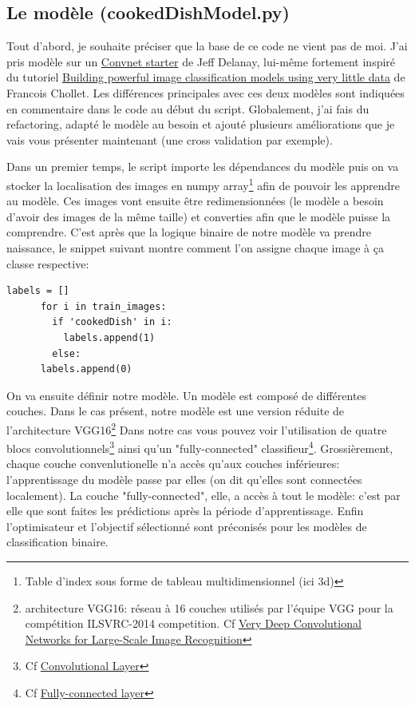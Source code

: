 \documentclass[a4paper,12pt]{report}
\begin{document}
      \subsection{Le modèle (cookedDishModel.py)}
      Tout d'abord, je souhaite préciser que la base de ce code ne vient pas de moi. J'ai pris modèle sur un \href{https://www.kaggle.com/vshevche/dogs-vs-cats-redux-kernels-edition/catdognet-keras-convnet-starter/run/790364}{Convnet starter} de Jeff Delanay, lui-même fortement inspiré du tutoriel \href{https://blog.keras.io/building-powerful-image-classification-models-using-very-little-data.html}{Building powerful image classification models using very little data} de Francois Chollet.
      \medbreak
      Les différences principales avec ces deux modèles sont indiquées en commentaire dans le code au début du script. Globalement, j'ai fais du refactoring, adapté le modèle au besoin et ajouté plusieurs améliorations que je vais vous présenter maintenant (une cross validation par exemple).
      \bigbreak

      Dans un premier temps, le script importe les dépendances du modèle puis on va stocker la localisation des images en numpy array\footnote{Table d'index sous forme de tableau multidimensionnel (ici 3d)} afin de pouvoir les apprendre au modèle. Ces images vont ensuite être redimensionnées (le modèle a besoin d'avoir des images de la même taille) et converties afin que le modèle puisse la comprendre.
      \medbreak
      C'est après que la logique binaire de notre modèle va prendre naissance, le snippet suivant montre comment l'on assigne chaque image à ça classe respective:
      \begin{lstlisting}[title=cookedDishModel.py (l.96)]
      labels = []
      for i in train_images:
        if 'cookedDish' in i:
          labels.append(1)
        else:
      labels.append(0)
      \end{lstlisting}
      \medbreak
      On va ensuite définir notre modèle. Un modèle est composé de différentes couches. Dans le cas présent, notre modèle est une version réduite de l'architecture VGG16\footnote{architecture VGG16: réseau à 16 couches utilisés par l'équipe VGG pour la compétition ILSVRC-2014 competition. Cf \href{https://arxiv.org/abs/1409.1556}{Very Deep Convolutional Networks for Large-Scale Image Recognition}}
      \medbreak
      Dans notre cas vous pouvez voir l'utilisation de quatre blocs convolutionnels\footnote{Cf \href{https://cs231n.github.io/convolutional-networks/\#conv}{Convolutional Layer}} ainsi qu'un "fully-connected" classifieur\footnote{Cf \href{https://cs231n.github.io/convolutional-networks/\#fc}{Fully-connected layer}}. Grossièrement, chaque couche convenlutionelle n'a accès qu'aux couches inférieures: l'apprentissage du modèle passe par elles (on dit qu'elles sont connectées localement). La couche "fully-connected", elle, a accès à tout le modèle: c'est par elle que sont faites les prédictions après la période d'apprentissage. Enfin l'optimisateur et l'objectif sélectionné sont préconisés pour les modèles de classification binaire.
\end{document}
